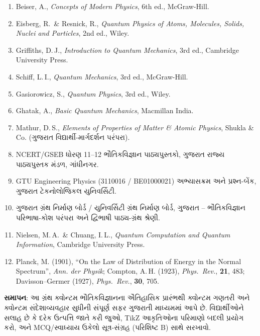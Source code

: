 \begin{enumerate}
  \item Beiser, A., \emph{Concepts of Modern Physics}, 6th ed., McGraw-Hill.
  \item Eisberg, R.\ \& Resnick, R., \emph{Quantum Physics of Atoms, Molecules, Solids,
        Nuclei and Particles}, 2nd ed., Wiley.
  \item Griffiths, D.\,J., \emph{Introduction to Quantum Mechanics}, 3rd ed., Cambridge
        University Press.
  \item Schiff, L.\,I., \emph{Quantum Mechanics}, 3rd ed., McGraw-Hill.
  \item Gasiorowicz, S., \emph{Quantum Physics}, 3rd ed., Wiley.
  \item Ghatak, A., \emph{Basic Quantum Mechanics}, Macmillan India.
  \item Mathur, D.\,S., \emph{Elements of Properties of Matter \& Atomic Physics}, Shukla
        \& Co. (ગુજરાત વિદ્યાર્થી-માર્ગદર્શન પરંપરા).
  \item NCERT/GSEB ધોરણ 11--12 ભૌતિકવિજ્ઞાન પાઠ્યપુસ્તકો, ગુજરાત રાજ્ય પાઠ્યપુસ્તક મંડળ,
        ગાંધીનગર.
  \item GTU Engineering Physics (3110016 / BE01000021) અભ્યાસક્રમ અને પ્રશ્ન-બેંક,
        ગુજરાત ટેકનોલોજિકલ યુનિવર્સિટી.
  \item ગુજરાત ગ્રંથ નિર્માણ બોર્ડ / યુનિવર્સિટી ગ્રંથ નિર્માણ બોર્ડ, ગુજરાત --
        ભૌતિકવિજ્ઞાન પરિભાષા-કોશ પરંપરા અને દ્વિભાષી પાઠ્ય-ગ્રંથ શ્રેણી.
  \item Nielsen, M.\,A.\ \& Chuang, I.\,L., \emph{Quantum Computation and Quantum
        Information}, Cambridge University Press.
  \item Planck, M. (1901), ``On the Law of Distribution of Energy in the Normal
        Spectrum'', \emph{Ann. der Physik}; Compton, A.\,H. (1923), \emph{Phys.\ Rev.},
        \textbf{21}, 483; Davisson--Germer (1927), \emph{Phys.\ Rev.}, \textbf{30}, 705.
\end{enumerate}

\vspace{6mm}
\begin{mulmudda}
\textbf{સમાપન}: આ ગ્રંથ ક્વોન્ટમ ભૌતિકવિજ્ઞાનના ઐતિહાસિક પ્રારંભથી ક્વોન્ટમ ગણતરી અને
ક્વોન્ટમ સંદેશાવ્યવહાર સુધીની સંપૂર્ણ સફર ગુજરાતી માધ્યમમાં આપે છે. વિદ્યાર્થીઓને સલાહ છે કે
દરેક ઉત્પત્તિ જાતે કરી જુઓ, TikZ આકૃતિઓના પરિમાણો બદલી પ્રયોગ કરો, અને MCQ/સ્વાધ્યાય
ઉકેલો સૂત્ર-સંગ્રહ (પરિશિષ્ટ B) સાથે સરખાવો.
\end{mulmudda}
